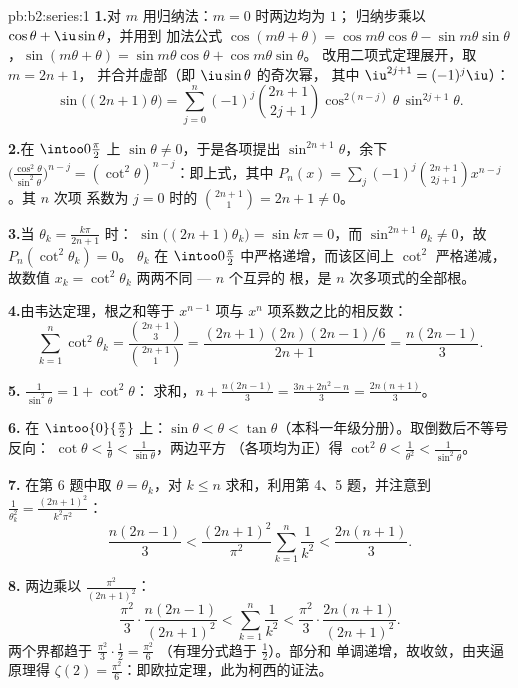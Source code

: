 \begin{solution}{pb:b2:series:1}
\textbf{1.}对 $m$ 用归纳法：$m = 0$ 时两边均为 $1$；
归纳步乘以 $\cos\theta + \iu\sin\theta$，并用到
加法公式 $\cos(m\theta + \theta) =
\cos m\theta\cos\theta - \sin m\theta\sin\theta$，$\sin(m\theta
+ \theta) = \sin m\theta\cos\theta + \cos m\theta\sin\theta$。
改用二项式定理展开，取 $m = 2n+1$，
并合并虚部（即 $\iu\sin\theta$ 的奇次幂，
其中 $\iu^{2j+1} = (-1)^j\iu$）：
\[
\sin\bigl((2n{+}1)\theta\bigr) = \sum_{j=0}^{n}(-1)^j
\binom{2n+1}{2j+1}\cos^{2(n-j)}\theta\,\sin^{2j+1}\theta .
\]

\textbf{2.}在 $\intoo0{\frac\pi2}$ 上 $\sin\theta \neq 0$，于是各项提出
$\sin^{2n+1}\theta$，余下
$\bigl(\frac{\cos^2\theta}{\sin^2\theta}\bigr)^{n-j} =
(\cot^2\theta)^{n-j}$：即上式，其中 $P_n(x) =
\sum_j(-1)^j\binom{2n+1}{2j+1}x^{n-j}$。其 $n$ 次项
系数为 $j = 0$ 时的 $\binom{2n+1}{1} = 2n + 1 \neq 0$。

\textbf{3.}当 $\theta_k = \frac{k\pi}{2n+1}$ 时：
$\sin\bigl((2n{+}1)\theta_k\bigr) = \sin k\pi = 0$，而
$\sin^{2n+1}\theta_k \neq 0$，故 $P_n(\cot^2\theta_k) = 0$。
$\theta_k$ 在 $\intoo0{\frac\pi2}$ 中严格递增，而该区间上
$\cot^2$ 严格递减，故数值 $x_k =
\cot^2\theta_k$ 两两不同 --- $n$ 个互异的
根，是 $n$ 次多项式的全部根。

\textbf{4.}由韦达定理，根之和等于
$x^{n-1}$ 项与 $x^n$ 项系数之比的相反数：
\[
\sum_{k=1}^{n}\cot^2\theta_k =
\frac{\binom{2n+1}{3}}{\binom{2n+1}{1}}
= \frac{(2n+1)(2n)(2n-1)/6}{2n+1} = \frac{n(2n-1)}{3}.
\]

\textbf{5.} $\frac{1}{\sin^2\theta} = 1 + \cot^2\theta$：
求和，$n + \frac{n(2n-1)}3 = \frac{3n + 2n^2 - n}{3} =
\frac{2n(n+1)}{3}$。

\textbf{6.} 在 $\intoo{0}{\frac\pi2}$ 上：$\sin\theta < \theta <
\tan\theta$（本科一年级分册）。取倒数后不等号反向：
$\cot\theta < \frac1\theta < \frac1{\sin\theta}$，两边平方
（各项均为正）得 $\cot^2\theta < \frac1{\theta^2} <
\frac1{\sin^2\theta}$。

\textbf{7.} 在第 6 题中取 $\theta = \theta_k$，对 $k \leq
n$ 求和，利用第 4、5 题，并注意到 $\frac1{\theta_k^2} =
\frac{(2n+1)^2}{k^2\pi^2}$：
\[
\frac{n(2n-1)}3 < \frac{(2n+1)^2}{\pi^2}\sum_{k=1}^n\frac1{k^2}
< \frac{2n(n+1)}3 .
\]

\textbf{8.} 两边乘以 $\frac{\pi^2}{(2n+1)^2}$：
\[
\frac{\pi^2}{3}\cdot\frac{n(2n-1)}{(2n+1)^2}
< \sum_{k=1}^{n}\frac1{k^2} <
\frac{\pi^2}{3}\cdot\frac{2n(n+1)}{(2n+1)^2}.
\]
两个界都趋于 $\frac{\pi^2}3\cdot\frac12 = \frac{\pi^2}6$
（有理分式趋于 $\frac12$）。部分和
单调递增，故收敛，由夹逼原理得 $\zeta(2) =
\frac{\pi^2}6$：即欧拉定理，此为柯西的证法。


\end{solution}
